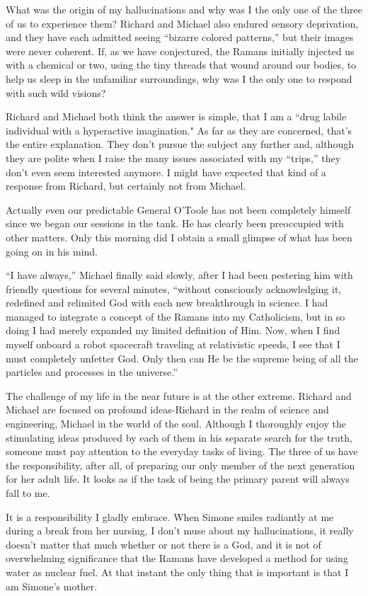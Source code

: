 \documentclass[]{article}
\begin{document}
What was the origin of my hallucinations and why was I the only one of the three of us to experience them? Richard and Michael also endured sensory deprivation, and they have each admitted seeing “bizarre colored patterns,” but their images were never coherent.  If, as we have conjectured, the Ramans initially injected us with a chemical or two, using the tiny threads that wound around our bodies, to help us sleep in the unfamiliar surroundings, why was I the only one to respond with such wild visions?

Richard and Michael both think the answer is simple, that I am a “drug labile individual with a hyperactive imagination."  As far as they are concerned, that’s the entire explanation.  They don’t pursue the subject any further and, although they are polite when I raise the many issues associated with my “trips,” they don’t even seem interested anymore.  I might have expected that kind of a response from Richard, but certainly not from Michael.

Actually even our predictable General O’Toole has not been completely himself since we began our sessions in the tank.  He has clearly been preoccupied with other matters.  Only this morning did I obtain a small glimpse of what has been going on in his mind.

“I have always,” Michael finally said slowly, after I had been pestering him with friendly questions for several minutes, “without consciously acknowledging it, redefined and relimited God with each new breakthrough in science.  I had managed to integrate a concept of the Ramans into my Catholicism, but in so doing I had merely expanded my limited definition of Him.  Now, when I find myself onboard a robot spacecraft traveling at relativistic speeds, I see that I must completely unfetter God.  Only then can He be the supreme being of all the particles and processes in the universe.”

The challenge of my life in the near future is at the other extreme.  Richard and Michael are focused on profound ideas-Richard in the realm of science and engineering, Michael in the world of the soul.  Although I thoroughly enjoy the stimulating ideas produced by each of them in his separate search for the truth, someone must pay attention to the everyday tasks of living.  The three of us have the responsibility, after all, of preparing our only member of the next generation for her adult life.  It looks as if the task of being the primary parent will always fall to me.

It is a responsibility I gladly embrace.  When Simone smiles radiantly at me during a break from her nursing, I don’t muse about my hallucinations, it really doesn’t matter that much whether or not there is a God, and it is not of overwhelming significance that the Ramans have developed a method for using water as nuclear fuel.  At that instant the only thing that is important is that I am Simone’s mother.
\end{document}
